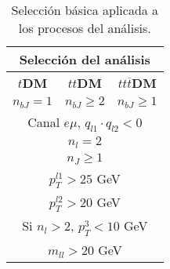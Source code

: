 \begin{table}[h!]
\centering
\begin{tabular}{|ccc|}
\hline
\multicolumn{3}{|c|}{\textbf{Selección del análisis}}                                                  \\ \hline
\multicolumn{1}{|c|}{$t$\textbf{DM}} & \multicolumn{1}{c|}{$tt$\textbf{DM}} & \textbf{$tt\overline{t}$DM} \\ \hline
\multicolumn{1}{|c|}{$n_{bJ} = 1$}       & \multicolumn{1}{c|}{$n_{bJ} \ge 2$}    & $n_{bJ} \ge 1$     \\ \hline
\multicolumn{3}{|c|}{Canal $e\mu$, $q_{l1} \cdot q_{l2} < 0$}                                            \\ \hline
\multicolumn{3}{|c|}{$n_l = 2$}                                                                        \\ \hline
\multicolumn{3}{|c|}{$n_J \ge 1$} 
                        \\ \hline
\multicolumn{3}{|c|}{$p_T^{l1} > 25 $ GeV}                                                                \\ \hline
\multicolumn{3}{|c|}{$p_T^{l2} > 20 $ GeV}                                                                \\ \hline
\multicolumn{3}{|c|}{Si $n_l > 2$, $p_T^3 < 10$ GeV}                                                   \\ \hline
\multicolumn{3}{|c|}{$m_{ll}> 20$ GeV}                                                                 \\ \hline

\end{tabular}
\caption{Selección básica aplicada a los procesos del análisis.}
\label{tab:preseleccion_anlisis}
\end{table}

